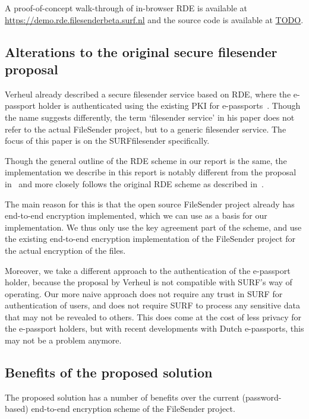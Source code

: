 A proof-of-concept walk-through of in-browser RDE is available at \url{https://demo.rde.filesenderbeta.surf.nl} and the source code is available at \url{TODO}.

\subsection{Alterations to the original secure filesender proposal}\label{subsec:alterations-to-the-rde-scheme}
Verheul already described a secure filesender service based on RDE, where the e-passport holder is authenticated using the existing PKI for e-passports~\cite{verheul2020secure}.
Though the name suggests differently, the term `filesender service' in his paper does not refer to the actual FileSender project, but to a generic filesender service.
The focus of this paper is on the SURFfilesender specifically.

Though the general outline of the RDE scheme in our report is the same, the implementation we describe in this report is notably different from the proposal in~\cite{verheul2020secure} and more closely follows the original RDE scheme as described in~\cite{verheul2017remote}.

The main reason for this is that the open source FileSender project already has end-to-end encryption implemented, which we can use as a basis for our implementation.
We thus only use the key agreement part of the scheme, and use the existing end-to-end encryption implementation of the FileSender project for the actual encryption of the files.

Moreover, we take a different approach to the authentication of the e-passport holder, because the proposal by Verheul is not compatible with SURF's way of operating.
Our more naive approach does not require any trust in SURF for authentication of users, and does not require SURF to process any sensitive data that may not be revealed to others.
This does come at the cost of less privacy for the e-passport holders, but with recent developments with Dutch e-passports, this may not be a problem anymore.

\subsection{Benefits of the proposed solution}\label{subsec:benefits-of-the-proposed-solution}
The proposed solution has a number of benefits over the current (password-based) end-to-end encryption scheme of the FileSender project.

